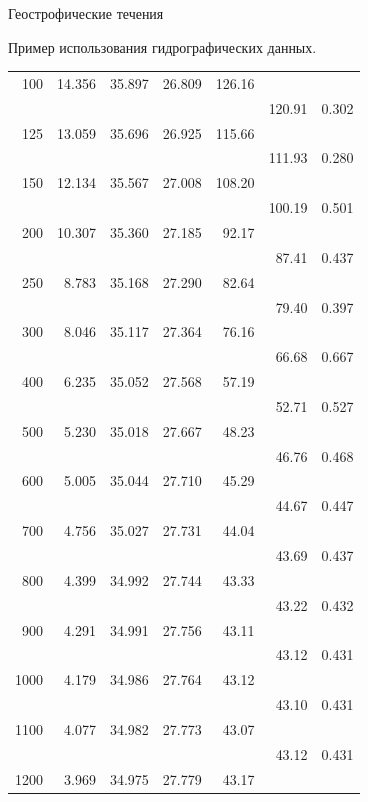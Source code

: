 \begin{chapter}{Геострофические течения}
\begin{section}{Пример использования гидрографических данных.}
\begin{table}[t!]
\begin{small}
\begin{center}
\begin{tabular}{rrrrrrl}
100&    14.356& 35.897& 26.809& 126.16&\\
 &            &       &       &       &     120.91& 0.302\\
125&    13.059& 35.696& 26.925& 115.66&\\
 &            &       &       &       &     111.93& 0.280\\
150&    12.134& 35.567& 27.008& 108.20&\\
 &            &       &       &       &     100.19& 0.501\\
200&    10.307& 35.360& 27.185& 92.17&\\
 &            &       &       &       &     87.41&  0.437\\
250&    8.783&  35.168& 27.290& 82.64&\\
 &            &       &       &       &     79.40&  0.397\\
300&    8.046&  35.117& 27.364& 76.16&\\
 &            &       &       &       &     66.68&  0.667\\
400&    6.235&  35.052& 27.568& 57.19&\\
 &            &       &       &       &     52.71&  0.527\\
500&    5.230&  35.018& 27.667& 48.23&\\
 &            &       &       &       &     46.76&  0.468\\
600&    5.005&  35.044& 27.710& 45.29&\\
 &            &       &       &       &     44.67&  0.447\\
700&    4.756&  35.027& 27.731& 44.04&\\
 &            &       &       &       &     43.69&  0.437\\
800&    4.399&  34.992& 27.744& 43.33&\\
 &            &       &       &       &     43.22&  0.432\\
900&    4.291&  34.991& 27.756& 43.11&\\
 &            &       &       &       &     43.12&  0.431\\
1000&   4.179&  34.986& 27.764& 43.12&\\
 &            &       &       &       &     43.10&  0.431\\
1100&   4.077&  34.982& 27.773& 43.07&\\
 &            &       &       &       &     43.12&  0.431\\
1200&   3.969&  34.975& 27.779& 43.17&\\

\end{tabular}
\end{center}
\end{small}
\end{table}
\end{section}
\end{chapter}
